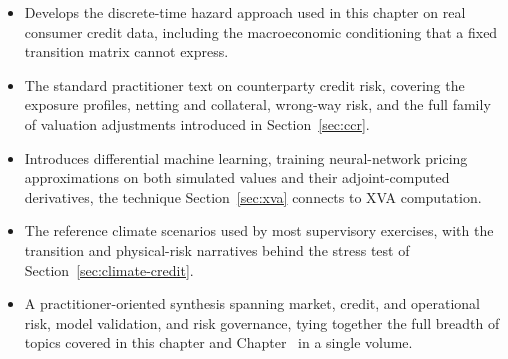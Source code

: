 \documentclass[../ai_in_finance]{subfiles}
\begin{document}
\begin{itemize}
    \item {} Develops the discrete-time hazard approach used in this chapter on real consumer credit data, including the macroeconomic conditioning that a fixed transition matrix cannot express.
    \item {} The standard practitioner text on counterparty credit risk, covering the exposure profiles, netting and collateral, wrong-way risk, and the full family of valuation adjustments introduced in Section~\ref{sec:ccr}.
    \item {} Introduces differential machine learning, training neural-network pricing approximations on both simulated values and their adjoint-computed derivatives, the technique Section~\ref{sec:xva} connects to XVA computation.
    \item {} The reference climate scenarios used by most supervisory exercises, with the transition and physical-risk narratives behind the stress test of Section~\ref{sec:climate-credit}.
    \item {} A practitioner-oriented synthesis spanning market, credit, and operational risk, model validation, and risk governance, tying together the full breadth of topics covered in this chapter and Chapter~ in a single volume.
\end{itemize}
\end{document}
